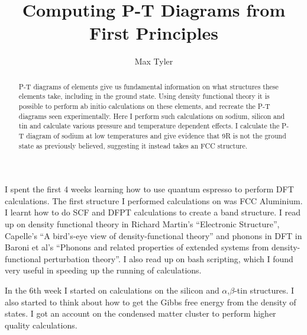 \documentclass[12pt]{article}
\begin{document}
\title{Computing P-T Diagrams from First Principles} %
\author{Max Tyler} %

\begin{abstract}
	P-T diagrams of elements give us fundamental information on what structures these elements take, including in the ground state. Using density functional theory it is possible to perform ab initio calculations on these elements, and recreate the P-T diagrams seen experimentally. 
	Here I perform such calculations on sodium, silicon and tin and calculate various pressure and temperature dependent effects. 
	I calculate the P-T diagram of sodium at low temperatures and give evidence that 9R is not the ground state as previously believed, suggesting it instead takes an FCC structure.
\end{abstract}

\maketitle

\personalstatement

I spent the first 4 weeks learning how to use quantum espresso to perform DFT calculations. The first structure I performed calculations on was FCC Aluminium. I learnt how to do SCF and DFPT calculations to create a band structure. 
I read up on density functional theory in Richard Martin's ``Electronic Structure'', Capelle's ``A bird's-eye view of density-functional theory'' and phonons in DFT in Baroni et al's ``Phonons and related properties of extended systems from density-functional perturbation theory''. 
I also read up on bash scripting, which I found very useful in speeding up the running of calculations.

In the 6th week I started on calculations on the silicon and $\alpha$,$\beta$-tin structures. I also started to think about how to get the Gibbs free energy from the density of states. I got an account on the condensed matter cluster to perform higher quality calculations. 
\end{document}
